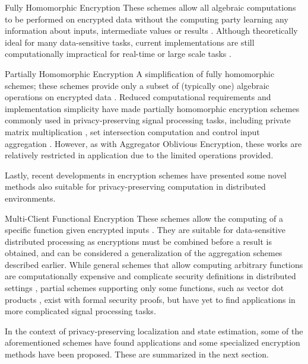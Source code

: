 \documentclass[10pt,letterpaper,oneside,twocolumn,journal]{IEEEtran}
\theoremstyle{definition}
\theoremstyle{definition}
\theoremstyle{remark}
\begin{document}
\begin{LaTeXdescription}
    \item[Fully Homomorphic Encryption] These schemes allow all algebraic computations to be performed on encrypted data without the computing party learning any information about inputs, intermediate values or results \cite{gentryFullyHomomorphicEncryption2009,stehleFasterFullyHomomorphic2010}. Although theoretically ideal for many data-sensitive tasks, current implementations are still computationally impractical for real-time or large scale tasks \cite{acarSurveyHomomorphicEncryption2018}.
    \item[Partially Homomorphic Encryption] A simplification of fully homomorphic schemes; these schemes provide only a subset of (typically one) algebraic operations on encrypted data \cite{elgamalPublicKeyCryptosystem1985,paillierPublicKeyCryptosystemsBased1999,bonehEvaluating2DNFFormulas2005}. Reduced computational requirements and implementation simplicity have made partially homomorphic encryption schemes commonly used in privacy-preserving signal processing tasks, including private matrix multiplication \cite{kogisoCyberSecurityEnhancementNetworked2015}, set intersection computation \cite{kerschbaumOutsourcedPrivateSet2012} and control input aggregation \cite{alexandruEncryptedCooperativeControl2019}. However, as with Aggregator Oblivious Encryption, these works are relatively restricted in application due to the limited operations provided.
\end{LaTeXdescription}
Lastly, recent developments in encryption schemes have presented some novel methods also suitable for privacy-preserving computation in distributed environments.
\begin{LaTeXdescription}
    \item[Multi-Client Functional Encryption] These schemes allow the computing of a specific function given encrypted inputs \cite{bonehFunctionalEncryptionDefinitions2011,goldwasserMultiinputFunctionalEncryption2014}. They are suitable for data-sensitive distributed processing as encryptions must be combined before a result is obtained, and can be considered a generalization of the aggregation schemes described earlier. While general schemes that allow computing arbitrary functions are computationally expensive and complicate security definitions in distributed settings \cite{agrawalFunctionalEncryptionNew2013}, partial schemes supporting only some functions, such as vector dot products \cite{chotardDecentralizedMultiClientFunctional2018}, exist with formal security proofs, but have yet to find applications in more complicated signal processing tasks.
\end{LaTeXdescription}
In the context of privacy-preserving localization and state estimation, some of the aforementioned schemes have found applications and some specialized encryption methods have been proposed. These are summarized in the next section.
\end{document}
